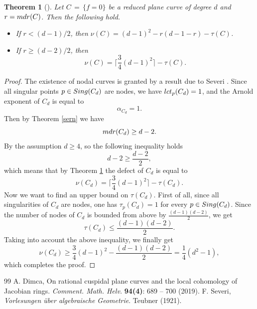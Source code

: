 \documentclass[10pt,a4paper]{amsart}
\newtheorem{theorem}{Theorem}
\begin{document}
\begin{theorem}[{\cite[Theorem 1.2]{Dimca1}}]
\label{deff}
Let $C \, = \, \{ f=0 \}$ be a reduced plane curve of degree $d$ and $r= {\rm mdr}(C)$. Then the following hold.
\begin{itemize}
    \item If $r < (d-1)/2$, then $\nu(C) = (d-1)^{2}-r(d-1-r)-\tau(C)$.
    \item If $r \geq (d-2)/2$, then
    $$\nu(C) = \bigg\lceil\frac{3}{4}(d-1)^{2}\bigg\rceil - \tau(C).$$
\end{itemize}
\end{theorem}

\begin{proof}
 The existence of nodal curves is granted by a result due to Severi \cite{Severi}. Since all singular points $p \in {\rm Sing}(C_{d})$ are nodes, we have ${\rm lct}_{p}(C_{d}) =1$, and the Arnold exponent of $C_{d}$ is equal to
 $$\alpha_{C_{d}} = 1.$$
 Then by Theorem \ref{sern} we have
 $${\rm mdr}(C_{d}) \geq d-2.$$
 By the assumption $d\geq 4$, so the following inequality holds
 $$d - 2 \geq \frac{d-2}{2},$$
 which means that by Theorem \ref{deff} the defect of $C_{d}$ is equal to 
 $$\nu(C_{d}) = \bigg\lceil\frac{3}{4}(d-1)^{2}\bigg\rceil - \tau(C_{d}).$$
 Now we want to find an upper bound on $\tau(C_{d})$. First of all, since all singularities of $C_{d}$ are nodes, one has $\tau_{p}(C_{d}) = 1$ for every $p \in {\rm Sing}(C_{d})$. Since the number of nodes of $C_{d}$ is bounded from above by $\frac{(d-1)(d-2)}{2}$, we get
 $$\tau(C_{d}) \leq \frac{(d-1)(d-2)}{2}.$$
 Taking into account the above inequality, we finally get 
 $$\nu(C_{d}) \geq \frac{3}{4}(d-1)^{2} - \frac{(d-1)(d-2)}{2} = \frac{1}{4}(d^{2}-1),$$
 which completes the proof.
\end{proof}

\begin{thebibliography}{99}
 A. Dimca, On rational cuspidal plane curves and the local cohomology of Jacobian rings. \textit{Comment. Math. Helv.} \textbf{94(4)}: 689 -- 700 (2019).
 F. Severi, \textit{Vorlesungen \"uber algebraische Geometrie}. Teubner (1921).
\end{thebibliography}
\end{document}

